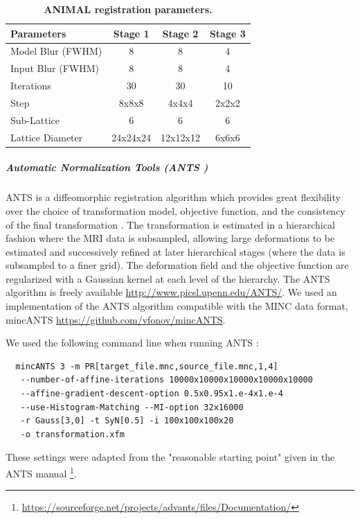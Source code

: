 \documentclass{article}\usepackage{graphicx, color}
\newcommand{\ants}{ANTS }
\newcommand{\animal}{ANIMAL }
\begin{document}
%                                     
\begin{table}[!tbp]
\scriptsize
\caption{\textbf{\animal registration parameters.} \label{tab:ANIMAL-params}}
\begin{center}
\begin{tabular}{l | c c c}
\hline 
Parameters        & Stage 1 & Stage 2 & Stage 3  \tabularnewline
\hline 
Model Blur (FWHM) &   8     &    8    &   4      \tabularnewline
Input Blur (FWHM) &   8     &    8    &   4      \tabularnewline
Iterations        &   30    &    30   &   10     \tabularnewline
Step              &   8x8x8 &  4x4x4  &   2x2x2  \tabularnewline
Sub-Lattice       &   6     &    6    &   6      \tabularnewline
Lattice Diameter  &24x24x24 &12x12x12 & 6x6x6    \tabularnewline
\hline
\end{tabular}
\end{center}
\end{table}

\subparagraph{Automatic Normalization Tools (\ants)}

\ants is a diffeomorphic registration algorithm which provides great flexibility
over the choice of transformation model, objective function, and the consistency
of the final transformation \citep{Avants2008}. The transformation is estimated in a
hierarchical fashion where the MRI data is subsampled, allowing large
deformations to be estimated and successively refined at later hierarchical
stages (where the data is subsampled to a finer grid). The deformation field and
the objective function are regularized with a Gaussian kernel at each level of
the hierarchy. The \ants algorithm is freely available
\url{http://www.picsl.upenn.edu/ANTS/}. We used an implementation of the \ants
algorithm compatible with the MINC data format, mincANTS
\url{https://github.com/vfonov/mincANTS}.

We used the following command line when running \ants:
{\small
\begin{verbatim}
  mincANTS 3 -m PR[target_file.mnc,source_file.mnc,1,4] 
   --number-of-affine-iterations 10000x10000x10000x10000x10000 
   --affine-gradient-descent-option 0.5x0.95x1.e-4x1.e-4
   --use-Histogram-Matching --MI-option 32x16000
   -r Gauss[3,0] -t SyN[0.5] -i 100x100x100x20
   -o transformation.xfm
 \end{verbatim}
}
These settings were adapted from the "reasonable starting point" given in the
\ants manual 
\footnote{\url{https://sourceforge.net/projects/advants/files/Documentation/}}.
\end{document}
